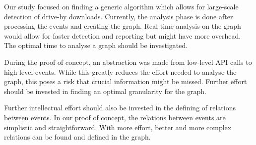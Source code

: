 Our study focused on finding a generic algorithm which allows for large-scale detection of drive-by downloads. Currently, the analysis phase is done after processing the events and creating the graph. Real-time analysis on the graph would allow for faster detection and reporting but might have more overhead. The optimal time to analyse a graph should be investigated.

During the proof of concept, an abstraction was made from low-level API calls to high-level events. While this greatly reduces the effort needed to analyse the graph, this poses a risk that crucial information might be missed. Further effort should be invested in finding an optimal granularity for the graph.

Further intellectual effort should also be invested in the defining of relations between events. In our proof of concept, the relations between events are simplistic and straightforward. With more effort, better and more complex relations can be found and defined in the graph.

